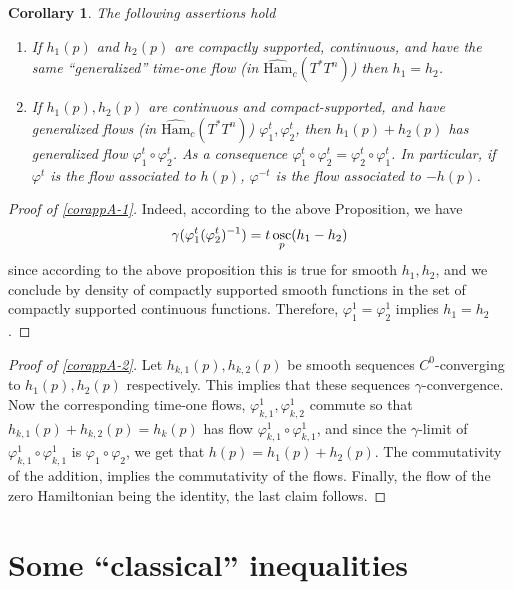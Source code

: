 \documentclass[JEP,XML,SOM,NoFloatCountersInSection,Unicode,published]{cedram}
\numberwithin{equation}{section}
\newcommand {\DHam}{\mathrm{Ham}}
\newcommand{\gclDHamc}[1]{\widehat{\DHam}_c(#1)}
\theoremstyle{plain}
\newtheorem{corollary}[theorem]{Corollary}
\theoremstyle{definition}
\theoremstyle{remark}
\begin{document}
\begin{corollary} \label{Cor-app-A}
The following assertions hold
\begin{enumerate}
\item \label{corappA-1} If $h_{1}(p)$ and $h_{2}(p)$ are compactly supported, continuous, and have the same ``generalized'' time-one flow (in $\gclDHamc{T^*T^n}$) then $h_{1}=h_{2}$.
\item \label{corappA-2} If $h_{1}(p),h_{2}(p)$ are continuous and compact-supported, and have generalized flows (in $\gclDHamc{T^*T^n}$) $\varphi_{1}^t, \varphi_{2}^t$, then $h_{1}(p)+h_{2}(p)$ has generalized flow $\varphi_{1}^t\circ \varphi_{2}^t$. As a consequence $\varphi_{1}^{t}\circ \varphi_{2}^{t}=\varphi_{2}^{t}\circ \varphi_{1}^{t}$.
In particular, if $\varphi^t$ is the flow associated to $h(p)$, $\varphi^{-t}$ is the flow associated to $-h(p)$.
\end{enumerate}
\end{corollary}

\begin{proof}[Proof of \eqref{corappA-1}]
Indeed, according to the above Proposition, we have
\[
\gamma (\varphi_{1}^t (\varphi_{2}^t)^{-1}) = t \operatornamewithlimits{osc}_{p} (h_{1}-h_{2})
\]
since according to the above proposition this is true for smooth $h_{1},h_{2}$, and we conclude by density of compactly supported smooth functions in the set of compactly supported continuous functions. Therefore, $\varphi_{1}^1=\varphi_{2}^1$ implies $h_{1}=h_{2}$.
\end{proof}

\begin{proof}[Proof of \eqref{corappA-2}]
Let $h_{k,1}(p), h_{k,2}(p)$ be smooth sequences $C^0$-converging to $h_1(p), h_2(p)$ respectively. This implies that these sequences $\gamma$-convergence. Now the corresponding time-one flows, $\varphi_{k,1}^1,\varphi_{k,2}^1$ commute so that $h_{k,1}(p)+h_{k,2}(p)=h_k(p)$ has flow
$\varphi_{k,1}^1\circ \varphi_{k,1}^1$, and since the $\gamma$-limit of $\varphi_{k,1}^1\circ \varphi_{k,1}^1$ is $ \varphi_1\circ \varphi_2$, we get that $h(p)=h_1(p)+h_2(p)$.
The commutativity of the addition, implies the commutativity of the flows. Finally, the flow of the zero Hamiltonian being the identity, the last claim follows.
\end{proof}

\section{Some ``classical'' inequalities}\label{Appendix-B}
\end{document}

